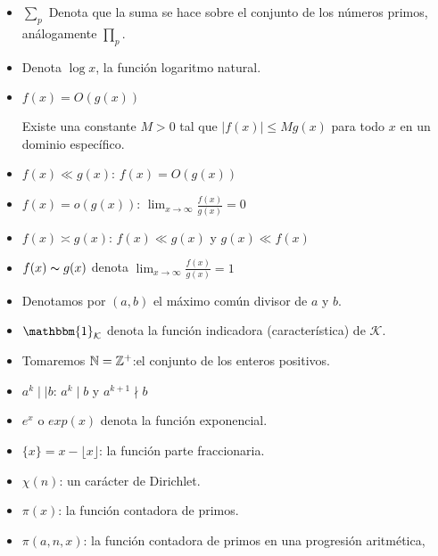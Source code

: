 \begin{itemize}[label=$\bullet$]

\item $\displaystyle\sum_p$ Denota que la suma se hace sobre el conjunto de los números primos, análogamente $\displaystyle\prod_p$.

\item Denota $\log x$, la función logaritmo natural.

\item $f(x)=O\left(g(x)\right)$

Existe una constante $M>0$ tal que $|f(x)|\leq Mg(x)$ para todo $x$ en un dominio específico.

\item $f(x)\ll g(x)$: \quad $f(x)=O(g(x))$

\item $f(x)=o(g(x))$: \quad $\displaystyle\lim_{x \to \infty}\frac{f(x)}{g(x)}=0$

\item $f(x)\asymp g(x)$: \quad $f(x)\ll g(x)$ y $g(x)\ll f(x)$

\item $f(x)\thicksim g(x)$ denota $\displaystyle \lim_{x \to \infty} \frac{f(x)}{g(x)}=1$

\item Denotamos por $(a,b)$ el máximo común divisor de $a$ y $b$.

\item $\mathbbm{1}_{\mathcal{K}}$ denota la función indicadora (característica) de $\mathcal{K}$.

\item Tomaremos $\mathbb{N}=\mathbb{Z}^{+}$:\quad el conjunto de los enteros positivos.

\item $a^k\mid\mid b$: \quad $a^k\mid b$ y $a^{k+1}\nmid b$

\item $e^{x}$ o $exp(x)$ denota la función exponencial.

\item $\{x\}=x-\lfloor x\rfloor$: la función parte fraccionaria.

\item $\chi(n)$: un carácter de Dirichlet.

\item $\pi(x)$: la función contadora  de primos.

\item $\pi(a,n,x)$: la función contadora  de primos en una progresión aritmética,


\end{itemize}
